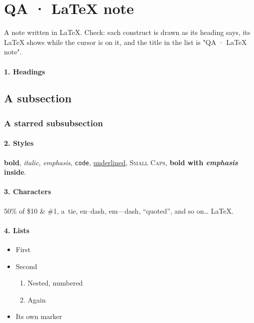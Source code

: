 \section{QA · LaTeX note}

A note written in LaTeX. Check: each construct is drawn as its heading says, its LaTeX shows while the cursor is on it, and the title in the list is "QA · LaTeX note".

\paragraph{1. Headings}

\subsection{A subsection}
\subsubsection*{A starred subsubsection}

\paragraph{2. Styles}

\textbf{bold}, \textit{italic}, \emph{emphasis}, \texttt{code}, \underline{underlined}, \textsc{Small Caps}, \textbf{bold with \emph{emphasis} inside}.

\paragraph{3. Characters}

50\% of \$10 \& \#1, a~tie, en--dash, em---dash, ``quoted'', and so on\ldots{} \LaTeX.

\paragraph{4. Lists}

\begin{itemize}
  \item First
  \item Second
  \begin{enumerate}
    \item Nested, numbered
    \item Again
  \end{enumerate}
  \item[--] Its own marker
\end{itemize}

